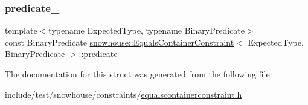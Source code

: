 \subsubsection{\texorpdfstring{predicate\_}{predicate\_}}
{\footnotesize\ttfamily template$<$typename Expected\+Type, typename Binary\+Predicate$>$ \\
const Binary\+Predicate \mbox{\hyperlink{structsnowhouse_1_1EqualsContainerConstraint}{snowhouse\+::\+Equals\+Container\+Constraint}}$<$ Expected\+Type, Binary\+Predicate $>$\+::predicate\+\_\+}



The documentation for this struct was generated from the following file\+:\begin{DoxyCompactItemize}
\item 
include/test/snowhouse/constraints/\mbox{\hyperlink{equalscontainerconstraint_8h}{equalscontainerconstraint.\+h}}\end{DoxyCompactItemize}
